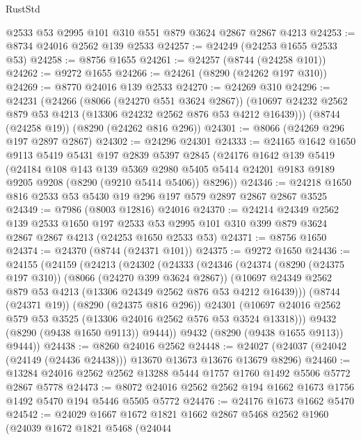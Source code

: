 \begin{lexlean}{RustStd}
\begin{coremodule}
    @2533
    @53
    @2995
    @101
    @310
    @551
    @879
    @3624
    @2867
    @2867
    @4213
@24253 := @8734 @24016 @2562 @139 @2533
@24257 := @24249 (@24253 @1655 @2533 @53)
@24258 := @8756 @1655
@24261 := @24257 (@8744 (@24258 @101))
@24262 := @9272 @1655
@24266 := @24261 (@8290 (@24262 @197 @310))
@24269 := @8770 @24016 @139 @2533
@24270 := @24269 @310
@24296 := @24231
    (@24266
      (@8066 (@24270 @551 @3624 @2867))
      (@10697 @24232 @2562 @879 @53 @4213 (@13306 @24232 @2562 @876 @53 @4212 @16439)))
    (@8744 (@24258 @19))
    (@8290 (@24262 @816 @296))
@24301 := @8066 (@24269 @296 @197 @2897 @2867)
@24302 := @24296 @24301
@24333 := @24165
    @1642
    @1650
    @9113
    @5419
    @5431
    @197
    @2839
    @5397
    @2845
    (@24176
      @1642
      @139
      @5419
      (@24184
        @108
        @143
        @139
        @5369
        @2980
        @5405
        @5414
        @24201
        @9183
        @9189
        @9205
        @9208
        (@8290 (@9210 @5414 @5406))
        @8296))
@24346 := @24218 @1650 @816 @2533 @53 @5430 @19 @296 @197 @579 @2897 @2867 @2867 @3525
@24349 := @7986 (@8003 @12816) @24016
@24370 := @24214
    @24349
    @2562
    @139
    @2533
    @1650
    @197
    @2533
    @53
    @2995
    @101
    @310
    @399
    @879
    @3624
    @2867
    @2867
    @4213
    (@24253 @1650 @2533 @53)
@24371 := @8756 @1650
@24374 := @24370 (@8744 (@24371 @101))
@24375 := @9272 @1650
@24436 := @24155
    (@24159
      (@24213
        (@24302
          (@24333
            (@24346
              (@24374
                (@8290 (@24375 @197 @310))
                (@8066 (@24270 @399 @3624 @2867))
                (@10697 @24349 @2562 @879 @53 @4213 (@13306 @24349 @2562 @876 @53 @4212 @16439)))
              (@8744 (@24371 @19))
              (@8290 (@24375 @816 @296))
              @24301
              (@10697 @24016 @2562 @579 @53 @3525 (@13306 @24016 @2562 @576 @53 @3524 @13318)))
            @9432
            (@8290 (@9438 @1650 @9113))
            @9444))
        @9432
        (@8290 (@9438 @1655 @9113))
        @9444))
@24438 := @8260 @24016 @2562
@24448 := @24027 (@24037 (@24042 (@24149 (@24436 @24438))) @13670 @13673 @13676 @13679 @8296)
@24460 := @13284 @24016 @2562 @2562 @13288 @5444 @1757 @1760 @1492 @5506 @5772 @2867 @5778
@24473 := @8072 @24016 @2562 @2562 @194 @1662 @1673 @1756 @1492 @5470 @194 @5446 @5505 @5772
@24476 := @24176 @1673 @1662 @5470
@24542 := @24029
    @1667
    @1672
    @1821
    @1662
    @2867
    @5468
    @2562
    @1960
    (@24039
      @1672
      @1821
      @5468
      (@24044

\end{coremodule}
\end{lexlean}
